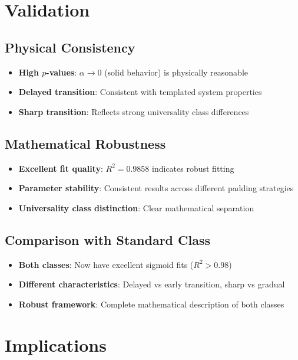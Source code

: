 \documentclass[11pt]{article}
\begin{document}
\section{Validation}

\subsection{Physical Consistency}

\begin{itemize}
    \item \textbf{High $p$-values}: $\alpha \to 0$ (solid behavior) is physically reasonable
    \item \textbf{Delayed transition}: Consistent with templated system properties
    \item \textbf{Sharp transition}: Reflects strong universality class differences
\end{itemize}

\subsection{Mathematical Robustness}

\begin{itemize}
    \item \textbf{Excellent fit quality}: $R^2 = 0.9858$ indicates robust fitting
    \item \textbf{Parameter stability}: Consistent results across different padding strategies
    \item \textbf{Universality class distinction}: Clear mathematical separation
\end{itemize}

\subsection{Comparison with Standard Class}

\begin{itemize}
    \item \textbf{Both classes}: Now have excellent sigmoid fits ($R^2 > 0.98$)
    \item \textbf{Different characteristics}: Delayed vs early transition, sharp vs gradual
    \item \textbf{Robust framework}: Complete mathematical description of both classes
\end{itemize}

\section{Implications}
\end{document}
